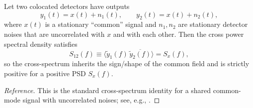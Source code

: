 \begin{proposition}
\label{prop:common_mode_crosscorr}
Let two colocated detectors have outputs
\begin{equation}
    y_1(t)=x(t)+n_1(t),\qquad y_2(t)=x(t)+n_2(t),
\end{equation}
where $x(t)$ is a stationary ``common'' signal and $n_1,n_2$ are stationary detector noises that are uncorrelated with $x$ and with each other. Then the cross power spectral density satisfies
\begin{equation}
    S_{12}(f)\equiv \langle \widetilde{y}_1(f)\,\overline{\widetilde{y}_2(f)}\rangle = S_x(f),
\end{equation}
so the cross-spectrum inherits the sign/shape of the common field and is strictly positive for a positive PSD $S_x(f)$.
\end{proposition}
\begin{proof}[Reference]
This is the standard cross-spectrum identity for a shared common-mode signal with uncorrelated noises; see, e.g., \cite{BendatPiersol2010}.
\end{proof}

